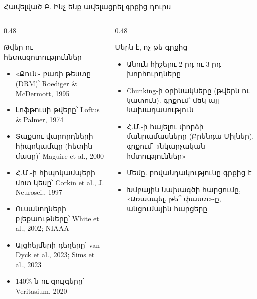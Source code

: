 \begin{frame}{Հավելված Բ. Ինչ ենք ավելացրել գրքից դուրս}
  \begin{columns}[T]
    \begin{column}{0.48\textwidth}
      \begin{card}[colback=mint!30!cardwhite, fontupper=\scriptsize]
        {\blackfont Թվեր ու հետազոտություններ}\par\smallskip
        \begin{itemize}\setlength{\itemsep}{0.5mm}
          \item «Քուն» բառի թեստը (DRM)՝ Roediger \& McDermott, 1995
          \item Լոֆթուսի թվերը՝ Loftus \& Palmer, 1974
          \item Տաքսու վարորդների հիպոկամպը (հետին մասը)՝ Maguire et al., 2000
          \item Հ.Մ.-ի հիպոկամպերի մոտ կեսը՝ Corkin et al., J. Neurosci., 1997
          \item Ուսանողների բլեքաութները՝ White et al., 2002; NIAAA
          \item Ալցհեյմերի դեղերը՝ van Dyck et al., 2023; Sims et al., 2023
          \item 140\%-ն ու զույգերը՝ Veritasium, 2020
        \end{itemize}
      \end{card}
    \end{column}
    \begin{column}{0.48\textwidth}
      \begin{card}[colback=peach!35!cardwhite, fontupper=\scriptsize]
        {\blackfont Մերն է, ոչ թե գրքից}\par\smallskip
        \begin{itemize}\setlength{\itemsep}{0.5mm}
          \item Անուն հիշելու 2-րդ ու 3-րդ խորհուրդները
          \item Chunking-ի օրինակները (թվերն ու կատուն). գրքում՝ մեկ այլ նախադասություն
          \item Հ.Մ.-ի հայելու փորձի մանրամասները (Բրենդա Միլներ). գրքում՝ «նկարչական հմտություններ»
          \item Մեմը. բովանդակությունը գրքից է
          \item Խմբային նախագծի հարցումը, «Առասպել, թե՞ փաստ»-ը, անցումային հարցերը
        \end{itemize}
      \end{card}
    \end{column}
  \end{columns}
\end{frame}

